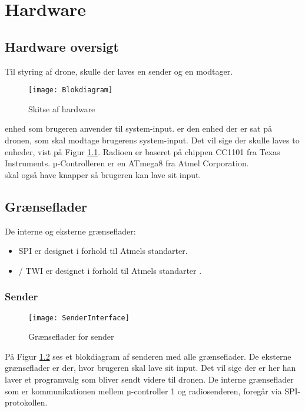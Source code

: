 \documentclass[Main]{subfiles}
\begin{document}
\chapter{Hardware}

\section{Hardware oversigt}

Til styring af drone, skulle der laves en sender og en modtager.

\begin{figure}[H]
\centering
\texttt{[image: Blokdiagram]}
\caption{Skitse af hardware}
\label{Fig:Blokdiagram}
\end{figure}

 enhed som brugeren anvender til system-input.
 er den enhed der er sat på dronen, som skal modtage brugerens system-input.
Det vil sige der skulle laves to enheder, vist på Figur \ref{Fig:Blokdiagram}.
Radioen er baseret på chippen CC1101\cite{TI-cc1101} fra Texas Instruments. 
µ-Controlleren er en ATmega8\cite{AtmelMega8} fra Atmel Corporation.
\\  skal også have knapper så brugeren kan lave sit input.


\newpage
\section{Grænseflader}
De interne og eksterne grænseflader:
\vspace{-20pt}
\begin{itemize}
\item SPI er designet i forhold til Atmels standarter\cite{SPI}.
\item \itoc / TWI er designet i forhold til Atmels standarter \cite{Twi}.
\end{itemize}




\subsection{Sender}
\begin{figure}[H]
\centering
\texttt{[image: SenderInterface]}
\caption{Grænseflader for sender}
\label{fig: SenderInterface}
\end{figure}

På Figur \ref{fig: SenderInterface} ses et blokdiagram af senderen med alle grænseflader.
De eksterne grænseflader er der, hvor brugeren skal lave sit input. Det vil sige der er her han laver et programvalg som bliver sendt videre til dronen.
De interne grænseflader som er kommunikationen mellem µ-controller 1 og radiosenderen, foregår via SPI-protokollen. 
\end{document}
